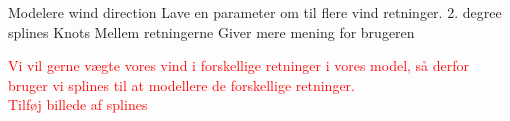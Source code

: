 Modelere wind direction
Lave en parameter om til flere vind retninger.
2. degree splines
Knots
Mellem retningerne
Giver mere mening for brugeren

\textcolor{red}{Vi vil gerne vægte vores vind i forskellige retninger i vores model, så derfor bruger vi splines til at modellere de forskellige retninger.} \\

\textcolor{red}{Tilføj billede af splines}



